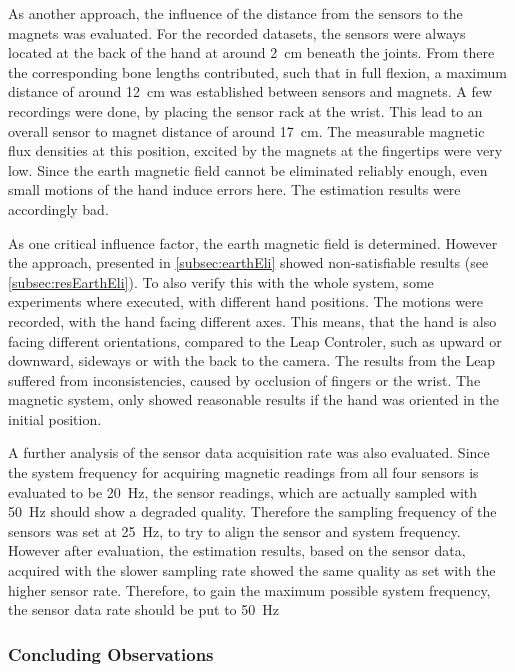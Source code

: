 As another approach, the influence of the distance from the sensors to the magnets was evaluated. For the recorded datasets, the sensors were always located at the back of the hand at around \SI{2}{\cm} beneath the joints. From there the corresponding bone lengths contributed, such that in full flexion, a maximum distance of around \SI{12}{\cm} was established between sensors and magnets. A few recordings were done, by placing the sensor rack at the wrist. This lead to an overall sensor to magnet distance of around \SI{17}{\cm}. The measurable magnetic flux densities at this position, excited by the magnets at the fingertips were very low. Since the earth magnetic field cannot be eliminated reliably enough, even small motions of the hand induce errors here. The estimation results were accordingly bad.

As one critical influence factor, the earth magnetic field is determined. However the approach, presented in \ref{subsec:earthEli} showed non-satisfiable results (see \ref{subsec:resEarthEli}). To also verify this with the whole system, some experiments where executed, with different hand positions. The motions were recorded, with the hand facing different axes. This means, that the hand is also facing different orientations, compared to the Leap Controler, such as upward or downward, sideways or with the back to the camera. The results from the Leap suffered from inconsistencies, caused by occlusion of fingers or the wrist. The magnetic system, only showed reasonable results if the hand was oriented in the initial position.

A further analysis of the sensor data acquisition rate was also evaluated. Since the system frequency for acquiring magnetic readings from all four sensors is evaluated to be \SI{20}{\Hz}, the sensor readings, which are actually sampled with \SI{50}{\Hz} should show a degraded quality. Therefore the sampling frequency of the sensors was set at \SI{25}{\Hz}, to try to align the sensor and system frequency. However after evaluation, the estimation results, based on the sensor data, acquired with the slower sampling rate showed the same quality as set with the higher sensor rate. Therefore, to gain the maximum possible system frequency, the sensor data rate should be put to \SI{50}{\Hz}


\subsubsection{Concluding Observations}

